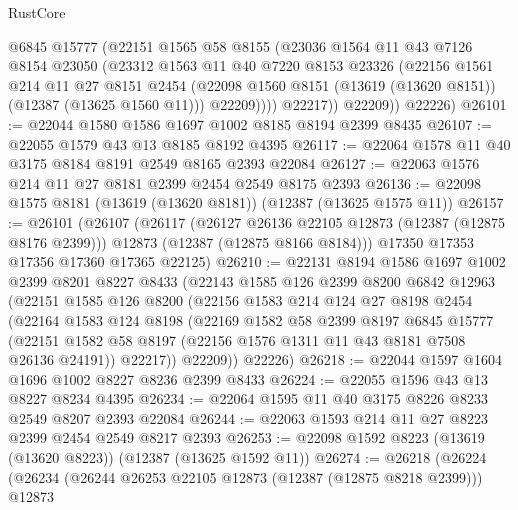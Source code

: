 \begin{lexlean}{RustCore}
\begin{coremodule}
              @6845
              @15777
              (@22151
                @1565
                @58
                @8155
                (@23036
                  @1564
                  @11
                  @43
                  @7126
                  @8154
                  @23050
                  (@23312
                    @1563
                    @11
                    @40
                    @7220
                    @8153
                    @23326
                    (@22156
                      @1561
                      @214
                      @11
                      @27
                      @8151
                      @2454
                      (@22098 @1560 @8151 (@13619 (@13620 @8151)) (@12387 (@13625 @1560 @11)))
                      @22209))))
              @22217))
          @22209))
      @22226)
@26101 := @22044 @1580 @1586 @1697 @1002 @8185 @8194 @2399 @8435
@26107 := @22055 @1579 @43 @13 @8185 @8192 @4395
@26117 := @22064 @1578 @11 @40 @3175 @8184 @8191 @2549 @8165 @2393 @22084
@26127 := @22063 @1576 @214 @11 @27 @8181 @2399 @2454 @2549 @8175 @2393
@26136 := @22098 @1575 @8181 (@13619 (@13620 @8181)) (@12387 (@13625 @1575 @11))
@26157 := @26101
    (@26107
      (@26117
        (@26127 @26136 @22105 @12873 (@12387 (@12875 @8176 @2399)))
        @12873
        (@12387 (@12875 @8166 @8184)))
      @17350
      @17353
      @17356
      @17360
      @17365
      @22125)
@26210 := @22131
    @8194
    @1586
    @1697
    @1002
    @2399
    @8201
    @8227
    @8433
    (@22143
      @1585
      @126
      @2399
      @8200
      @6842
      @12963
      (@22151
        @1585
        @126
        @8200
        (@22156
          @1583
          @214
          @124
          @27
          @8198
          @2454
          (@22164
            @1583
            @124
            @8198
            (@22169
              @1582
              @58
              @2399
              @8197
              @6845
              @15777
              (@22151 @1582 @58 @8197 (@22156 @1576 @1311 @11 @43 @8181 @7508 @26136 @24191))
              @22217))
          @22209))
      @22226)
@26218 := @22044 @1597 @1604 @1696 @1002 @8227 @8236 @2399 @8433
@26224 := @22055 @1596 @43 @13 @8227 @8234 @4395
@26234 := @22064 @1595 @11 @40 @3175 @8226 @8233 @2549 @8207 @2393 @22084
@26244 := @22063 @1593 @214 @11 @27 @8223 @2399 @2454 @2549 @8217 @2393
@26253 := @22098 @1592 @8223 (@13619 (@13620 @8223)) (@12387 (@13625 @1592 @11))
@26274 := @26218
    (@26224
      (@26234
        (@26244 @26253 @22105 @12873 (@12387 (@12875 @8218 @2399)))
        @12873

\end{coremodule}
\end{lexlean}
